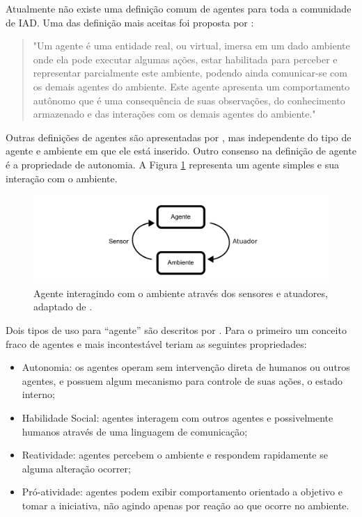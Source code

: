 Atualmente não existe uma definição comum de agentes para toda a comunidade de IAD. Uma das definição mais aceitas foi proposta por \citet{ferber1991agent}:
\begin{quotation}
"Um agente é uma entidade real, ou virtual, imersa em um dado ambiente onde ela pode executar algumas ações, estar habilitada para perceber e representar parcialmente este ambiente, podendo ainda comunicar-se com os demais agentes do ambiente. Este agente apresenta um comportamento autônomo que é uma consequência de suas observações, do conhecimento armazenado e das interações com os demais agentes do ambiente."
\end{quotation}

Outras definições de agentes são apresentadas por \cite{wooldridge1995intelligent,franklin1996agent,russell2002artificial}, mas independente do tipo de agente e ambiente em que ele está inserido. Outro consenso na definição de agente é a propriedade de autonomia. A Figura \ref{fig:agente} representa um agente simples e sua interação com o ambiente.

\begin{figure}[ht]
\centering
\includegraphics[scale=0.8]{imagens/agente.pdf}
\caption{Agente interagindo com o ambiente através dos sensores e atuadores, adaptado de \cite{russell2002artificial}.}
\label{fig:agente}
\end{figure}

Dois tipos de uso para “agente” são descritos por \citet{wooldridge1995intelligent}. Para o primeiro um conceito fraco de agentes e mais incontestável teriam as seguintes propriedades:

\begin{itemize}
\item Autonomia: os agentes operam sem intervenção direta de humanos ou outros agentes, e possuem algum mecanismo para controle de suas ações, o estado interno;
\item Habilidade Social: agentes interagem com outros agentes e possivelmente humanos através de uma linguagem de comunicação;
\item Reatividade: agentes percebem o ambiente e respondem rapidamente se alguma alteração ocorrer;
\item Pró-atividade: agentes podem exibir comportamento orientado a objetivo e tomar a iniciativa, não agindo apenas por reação ao que ocorre no ambiente.
\end{itemize}

